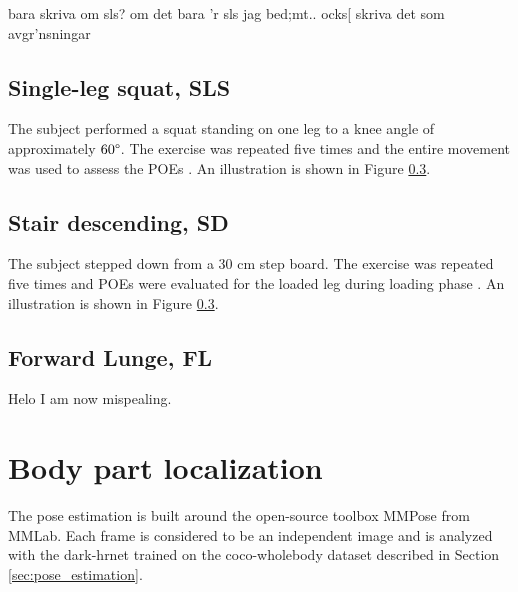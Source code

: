bara skriva om sls? om det bara 'r sls jag bed;mt.. ocks[ skriva det som avgr'nsningar

\subsection{Single-leg squat, SLS} \label{sec:met-SLS}
The subject performed a squat standing on one leg to a knee angle of approximately $60\degree$. The exercise was repeated five times and the entire movement was used to assess the POEs \cite{Nae2020}. An illustration is shown in Figure \ref{}.

\subsection{Stair descending, SD}
The subject stepped down from a 30 cm step board. The exercise was repeated five times and POEs were evaluated for the loaded leg during loading phase \cite{Nae2020}. An illustration is shown in Figure \ref{}.

\subsection{Forward Lunge, FL}

Helo I am now mispealing.





\section{Body part localization} \label{sec:met-loc}
The pose estimation is built around the open-source toolbox MMPose \cite{mmpose} from MMLab. Each frame is considered to be an independent image and is analyzed with the \gls{dark}-\gls{hrnet} trained on the \gls{coco}-wholebody dataset described in Section \ref{sec:pose_estimation}. %

